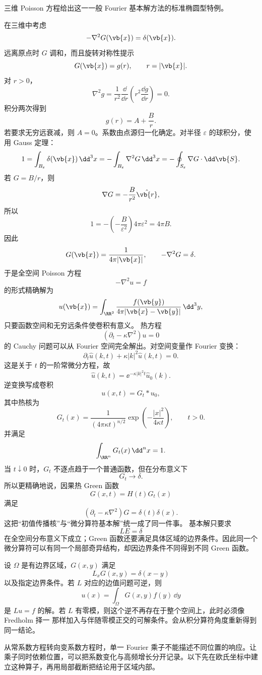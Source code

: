 三维 Poisson 方程给出这一一般 Fourier 基本解方法的标准椭圆型特例。

在三维中考虑
\[
-\nabla^2G(\vb{x})=\delta(\vb{x}).
\]
远离原点时 $G$ 调和，而且旋转对称性提示
\[
G(\vb{x})=g(r),
\qquad r=|\vb{x}|.
\]
对 $r>0$，
\[
\nabla^2g
=\frac1{r^2}\frac{\dd}{\dd r}
\left(r^2\frac{\dd g}{\dd r}\right)=0.
\]
积分两次得到
\[
g(r)=A+\frac{B}{r}.
\]
若要求无穷远衰减，则 $A=0$。系数由点源归一化确定。对半径 $\varepsilon$ 的球积分，使用 Gauss 定理：
\[
1=\int_{B_\varepsilon}\delta(\vb{x})\,\dd^3x
=-\int_{B_\varepsilon}\nabla^2G\,\dd^3x
=-\oint_{S_\varepsilon}\nabla G\cdot\dd\vb{S}.
\]
若 $G=B/r$，则
\[
\nabla G=-\frac{B}{r^2}\hat{\vb{r}},
\]
所以
\[
1=-\left(-\frac{B}{\varepsilon^2}\right)4\pi\varepsilon^2
=4\pi B.
\]
因此
\begin{equation*}{
G(\vb{x})=\frac1{4\pi|\vb{x}|},
\qquad
-\nabla^2G=\delta
}.\end{equation*}
于是全空间 Poisson 方程
\[
-\nabla^2u=f
\]
的形式精确解为
\[
u(\vb{x})=\int_{\RR^3}
\frac{f(\vb{y})}{4\pi|\vb{x}-\vb{y}|}\,\dd^3y,
\]
只要函数空间和无穷远条件使卷积有意义。
热方程
\[
(\partial_t-\kappa\nabla^2)u=0
\]
的 Cauchy 问题可以从 Fourier 空间完全解出。对空间变量作 Fourier 变换：
\[
\partial_t\widehat u(k,t)+\kappa|k|^2\widehat u(k,t)=0.
\]
这是关于 $t$ 的一阶常微分方程，故
\[
\widehat u(k,t)=\ee^{-\kappa|k|^2t}\widehat u_0(k).
\]
逆变换写成卷积
\[
u(x,t)=G_t*u_0,
\]
其中热核为
\begin{equation*}{
G_t(x)=\frac1{(4\pi\kappa t)^{n/2}}
\exp\!\left(-\frac{|x|^2}{4\kappa t}\right),
\qquad t>0
}.\end{equation*}
并满足
\[
\int_{\RR^n}G_t(x)\,\dd^nx=1.
\]
当 $t\downarrow0$ 时，$G_t$ 不逐点趋于一个普通函数，但在分布意义下
\[
G_t\longrightarrow\delta.
\]
所以更精确地说，因果热 Green 函数
\[
G(x,t)=H(t)G_t(x)
\]
满足
\[
(\partial_t-\kappa\nabla^2)G
=\delta(t)\delta(x).
\]
这把“初值传播核”与“微分算符基本解”统一成了同一件事。
基本解只要求
\[
L E=\delta
\]
在全空间分布意义下成立；Green 函数还要满足具体区域的边界条件。因此同一个微分算符可以有同一个局部奇异结构，却因边界条件不同得到不同 Green 函数。

设 $\Omega$ 是有边界区域，$G(x,y)$ 满足
\[
L_xG(x,y)=\delta(x-y)
\]
以及指定边界条件。若 $L$ 对应的边值问题可逆，则
\[
u(x)=\int_\Omega G(x,y)f(y)\,\dd y
\]
是 $Lu=f$ 的解。若 $L$ 有零模，则这个逆不再存在于整个空间上，此时必须像 Fredholm 择一 那样加入与伴随零模正交的可解条件。会从积分算符角度重新得到同一结论。

从常系数方程转向变系数方程时，单一 Fourier 乘子不能描述不同位置的响应。让乘子同时依赖位置，可以把系数变化与高频增长分开记录。以下先在欧氏坐标中建立这种算子，再用局部截断把结论用于区域内部。


